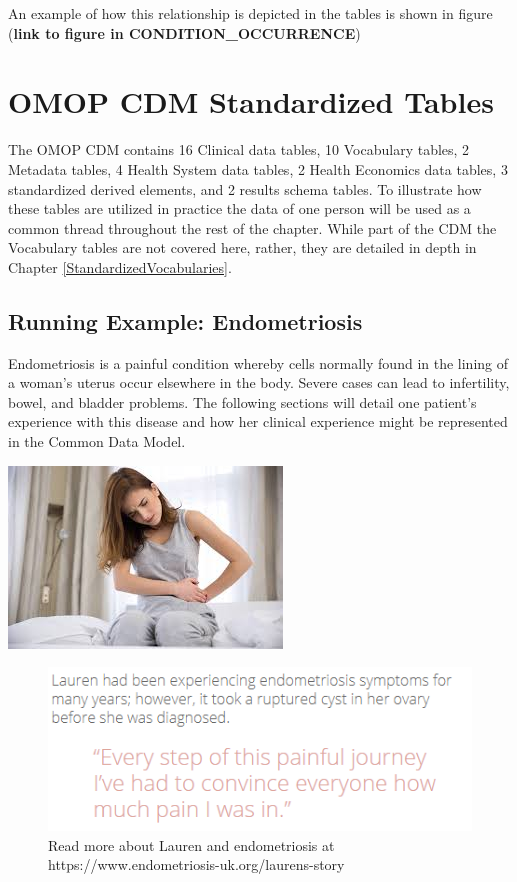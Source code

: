 \documentclass[]{book}
\begin{document}
An example of how this relationship is depicted in the tables is shown
in figure (\textbf{link to figure in CONDITION\_OCCURRENCE})

\section{OMOP CDM Standardized
Tables}\label{omop-cdm-standardized-tables}

The OMOP CDM contains 16 Clinical data tables, 10 Vocabulary tables, 2
Metadata tables, 4 Health System data tables, 2 Health Economics data
tables, 3 standardized derived elements, and 2 results schema tables. To
illustrate how these tables are utilized in practice the data of one
person will be used as a common thread throughout the rest of the
chapter. While part of the CDM the Vocabulary tables are not covered
here, rather, they are detailed in depth in Chapter
\ref{StandardizedVocabularies}.

\subsection{Running Example:
Endometriosis}\label{running-example-endometriosis}

Endometriosis is a painful condition whereby cells normally found in the
lining of a woman's uterus occur elsewhere in the body. Severe cases can
lead to infertility, bowel, and bladder problems. The following sections
will detail one patient's experience with this disease and how her
clinical experience might be represented in the Common Data Model.

\includegraphics[width=0.5\linewidth]{images/CommonDataModel/Lauren}

\begin{figure}
\includegraphics[width=0.75\linewidth]{images/CommonDataModel/laurentext} \caption{Read more about Lauren and endometriosis at https://www.endometriosis-uk.org/laurens-story}\label{fig:Laurentext}
\end{figure}
\end{document}
